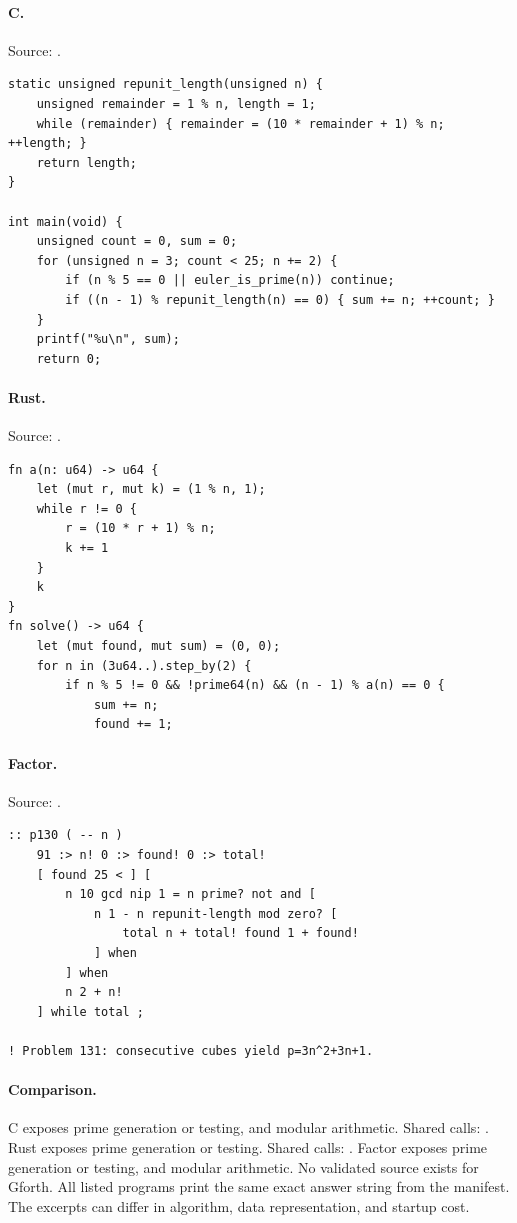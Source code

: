 \paragraph{C.} Source: .
\begin{lstlisting}
static unsigned repunit_length(unsigned n) {
    unsigned remainder = 1 % n, length = 1;
    while (remainder) { remainder = (10 * remainder + 1) % n; ++length; }
    return length;
}

int main(void) {
    unsigned count = 0, sum = 0;
    for (unsigned n = 3; count < 25; n += 2) {
        if (n % 5 == 0 || euler_is_prime(n)) continue;
        if ((n - 1) % repunit_length(n) == 0) { sum += n; ++count; }
    }
    printf("%u\n", sum);
    return 0;
\end{lstlisting}

\paragraph{Rust.} Source: .
\begin{lstlisting}
fn a(n: u64) -> u64 {
    let (mut r, mut k) = (1 % n, 1);
    while r != 0 {
        r = (10 * r + 1) % n;
        k += 1
    }
    k
}
fn solve() -> u64 {
    let (mut found, mut sum) = (0, 0);
    for n in (3u64..).step_by(2) {
        if n % 5 != 0 && !prime64(n) && (n - 1) % a(n) == 0 {
            sum += n;
            found += 1;
\end{lstlisting}

\paragraph{Factor.} Source: .
\begin{lstlisting}
:: p130 ( -- n )
    91 :> n! 0 :> found! 0 :> total!
    [ found 25 < ] [
        n 10 gcd nip 1 = n prime? not and [
            n 1 - n repunit-length mod zero? [
                total n + total! found 1 + found!
            ] when
        ] when
        n 2 + n!
    ] while total ;

! Problem 131: consecutive cubes yield p=3n^2+3n+1.
\end{lstlisting}

\paragraph{Comparison.}
C exposes prime generation or testing, and modular arithmetic. Shared calls: \texttt{}. Rust exposes prime generation or testing. Shared calls: \texttt{}. Factor exposes prime generation or testing, and modular arithmetic.
No validated source exists for Gforth.
All listed programs print the same exact answer string from the manifest. The excerpts can differ in algorithm, data representation, and startup cost.

